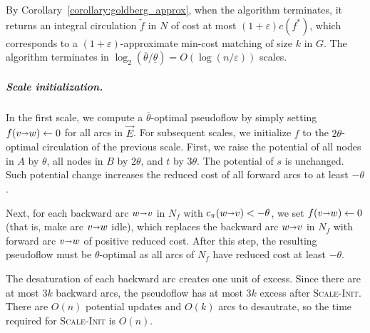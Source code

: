 \documentclass[a4paper,UKenglish,nolineno]{socg-lipics-v2019}
\def\eps{\varepsilon}
\def\arcto{\mathord\shortrightarrow}
\def\arc#1#2{#1\arcto#2}
\def\cost{c}
\begin{document}
By Corollary~\ref{corollary:goldberg_approx}, when the algorithm terminates,
it returns an integral circulation $\tilde{f}$ in $N$ of cost at most
$(1+\eps) \cost(f^*)$, which corresponds to a $(1+\eps)$-approximate min-cost
matching of size $k$ in $G$.
The algorithm terminates in
$\log_2(\overline{\theta}/\underline{\theta}) = O(\log(n/\eps))$ scales.


\subparagraph{Scale initialization.}
In the first scale, we compute a $\overline{\theta}$-optimal pseudoflow by
simply setting $f(\arc vw) \gets 0$ for all arcs in $\vec{E}$.
For subsequent scales, we initialize $f$ to the $2\theta$-optimal circulation of the previous scale.
First, we raise the potential of all nodes in $A$ by $\theta$, all nodes in $B$ by $2\theta$,
and $t$ by $3\theta$.
The potential of $s$ is unchanged.
%
Such potential change increases the reduced cost of all forward arcs to at least
$-\theta$.

Next, for each backward arc $\arc wv$ in $N_f$ with $c_\pi(\arc wv) < -\theta$,
we set $f(\arc vw) \gets 0$ (that is, make arc $\arc vw$ idle), which replaces the
backward arc $\arc wv$ in $N_f$ with forward arc $\arc vw$ of positive reduced cost.
After this step, the resulting pseudoflow must be $\theta$-optimal as all arcs
of $N_f$ have reduced cost at least $-\theta$.

The desaturation of each backward arc creates one unit of excess.
Since there are at most $3k$ backward arcs, the pseudoflow has at most $3k$ excess after
\textsc{Scale-Init}.
There are $O(n)$ potential updates and $O(k)$ arcs to desautrate,
so the time required for \textsc{Scale-Init} is $O(n)$.
\end{document}
